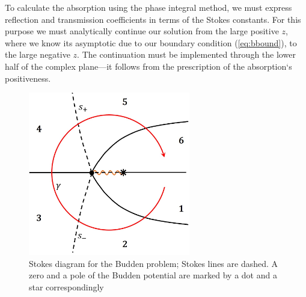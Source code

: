 \documentclass{ws-m3as}
\def\mytextwidth{0.63\textwidth}
\newcommand\eref[1]{(\ref{#1})}
\begin{document}
To calculate the absorption using the phase integral method, we must express 
reflection and transmission coefficients in terms of the Stokes constants. 
For this purpose we must analytically continue our solution from the large positive $z$,
where we know its asymptotic due to our boundary condition \eref{eq:bbound}, to
the large negative $z$. The continuation must be implemented through the lower half of the
complex plane---it follows from the prescription of the absorption`s positiveness\cite{rwbook}.

\begin{figure}
\centering
\noindent
\includegraphics[width=\mytextwidth]{sd.jpg}
\vspace*{8pt}
\caption
{Stokes diagram for the Budden problem; Stokes lines are dashed.
A zero and a pole of the Budden potential are marked by a dot and a star correspondingly}
\label{fig:diagram}
\end{figure} 
\end{document}
